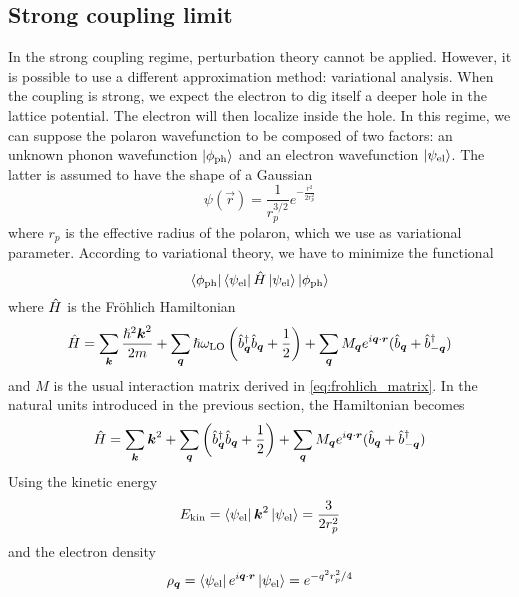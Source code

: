 \subsection{Strong coupling limit}
In the strong coupling regime, perturbation theory cannot be applied. However, it is possible to use a different approximation method: variational analysis. When the coupling is strong, we expect the electron to dig itself a deeper hole in the lattice potential. The electron will then localize inside the hole. In this regime, we can suppose the polaron wavefunction to be composed of two factors: an unknown phonon wavefunction $\ket{\phi_\text{ph}}$ and an electron wavefunction $\ket{\psi_\text{el}}$. The latter is assumed to have the shape of a Gaussian
\begin{equation}
    \psi(\vec{r}) = \frac{1}{r_p^{3/2}}e^{-\frac{r^2}{2r_p^2}}
\end{equation}
where $r_p$ is the effective radius of the polaron, which we use as variational parameter. According to variational theory, we have to minimize the functional
\begin{equation}
    \bra{\phi_\text{ph}} \bra{\psi_\text{el}} \hat{H} \ket{\psi_\text{el}} \ket{\phi_\text{ph}}
\end{equation}
where $\hat{H}$ is the Fröhlich Hamiltonian
\begin{equation}
    \hat{H} = \sum_{\mathbf{\boldsymbol{k}}} \frac{\hslash^2\mathbf{\boldsymbol{k}}^2}{2m}
    + \sum_{\mathbf{\boldsymbol{q}}} \hslash \omega_\text{LO} \left( \hat{b}^\dagger_{ \mathbf{\boldsymbol{q}}} \hat{b}_{ \mathbf{\boldsymbol{q}}} + \frac{1}{2} \right)
    + \sum_{\mathbf{\boldsymbol{q}}} M_{\mathbf{\boldsymbol{q}}} e^{i\mathbf{\boldsymbol{q}}\cdot\mathbf{\boldsymbol{r}}} (\hat{b}_{\mathbf{\boldsymbol{q}}} + \hat{b}^\dagger_{-\mathbf{\boldsymbol{q}}})
\end{equation}
and $M$ is the usual interaction matrix derived in \cref{eq:frohlich_matrix}. In the natural units introduced in the previous section, the Hamiltonian becomes
\begin{equation}
    \hat{H} = \sum_{\mathbf{\boldsymbol{k}}} \mathbf{\boldsymbol{k}}^2
    + \sum_{\mathbf{\boldsymbol{q}}} \left( \hat{b}^\dagger_{ \mathbf{\boldsymbol{q}}} \hat{b}_{ \mathbf{\boldsymbol{q}}} + \frac{1}{2} \right)
    + \sum_{\mathbf{\boldsymbol{q}}} M_{\mathbf{\boldsymbol{q}}} e^{i\mathbf{\boldsymbol{q}}\cdot\mathbf{\boldsymbol{r}}} (\hat{b}_{\mathbf{\boldsymbol{q}}} + \hat{b}^\dagger_{-\mathbf{\boldsymbol{q}}})
\end{equation}
Using the kinetic energy
\begin{equation}
    E_\text{kin} = \bra{\psi_\text{el}} \mathbf{\boldsymbol{k}}^2 \ket{\psi_\text{el}}  = \frac{3}{2r_p^2}
\end{equation}
and the electron density
\begin{equation} \label{eq:electron_density}
    \rho_{\mathbf{\boldsymbol{q}}} = \bra{\psi_\text{el}} e^{i\mathbf{\boldsymbol{q}}\cdot\mathbf{\boldsymbol{r}}} \ket{\psi_\text{el}} = e^{-q^2r_p^2/4}
\end{equation}
